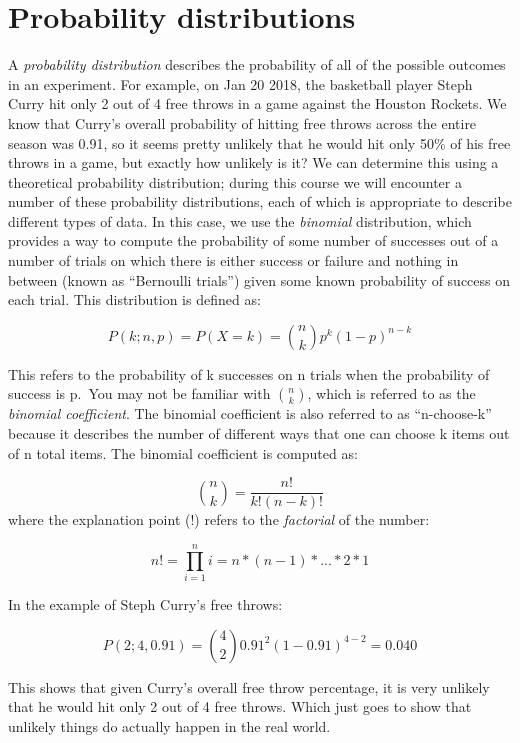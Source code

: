 \documentclass[12pt,]{book}
\theoremstyle{definition}
\theoremstyle{definition}
\theoremstyle{definition}
\theoremstyle{remark}
\begin{document}
\hypertarget{probability-distributions}{%
\section{Probability distributions}\label{probability-distributions}}

A \emph{probability distribution} describes the probability of all of the possible outcomes in an experiment. For example, on Jan 20 2018, the basketball player Steph Curry hit only 2 out of 4 free throws in a game against the Houston Rockets. We know that Curry's overall probability of hitting free throws across the entire season was 0.91, so it seems pretty unlikely that he would hit only 50\% of his free throws in a game, but exactly how unlikely is it? We can determine this using a theoretical probability distribution; during this course we will encounter a number of these probability distributions, each of which is appropriate to describe different types of data. In this case, we use the \emph{binomial} distribution, which provides a way to compute the probability of some number of successes out of a number of trials on which there is either success or failure and nothing in between (known as ``Bernoulli trials'') given some known probability of success on each trial. This distribution is defined as:

\[
P(k; n,p) = P(X=k) = \binom{n}{k} p^k(1-p)^{n-k}
\]

This refers to the probability of k successes on n trials when the probability of success is p.~You may not be familiar with \(\binom{n}{k}\), which is referred to as the \emph{binomial coefficient}. The binomial coefficient is also referred to as ``n-choose-k'' because it describes the number of different ways that one can choose k items out of n total items. The binomial coefficient is computed as:

\[
\binom{n}{k} = \frac{n!}{k!(n-k)!}
\]
where the explanation point (!) refers to the \emph{factorial} of the number:

\[
n! = \prod_{i=1}^n i = n*(n-1)*...*2*1 
\]

In the example of Steph Curry's free throws:

\[
P(2;4,0.91) = \binom{4}{2} 0.91^2(1-0.91)^{4-2} = 0.040
\]

This shows that given Curry's overall free throw percentage, it is very unlikely that he would hit only 2 out of 4 free throws. Which just goes to show that unlikely things do actually happen in the real world.
\end{document}
